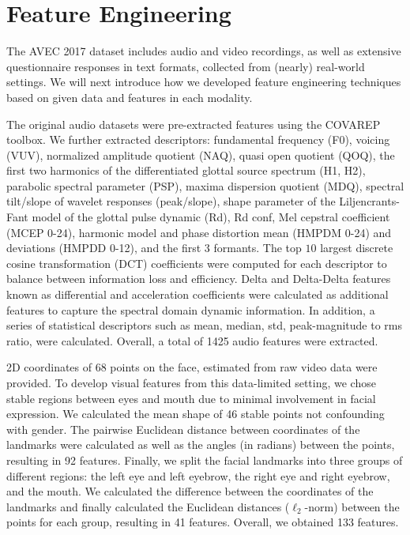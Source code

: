 \documentclass[letterpaper]{article} %
\begin{document}
\section{Feature Engineering}

The AVEC 2017 dataset includes audio and video recordings, as well as extensive questionnaire responses in text formats, collected from (nearly) real-world settings. We will next introduce how we developed feature engineering techniques based on given data and features in each modality. 

The original audio datasets were pre-extracted features using the COVAREP toolbox.  We further extracted descriptors: fundamental frequency (F0), voicing (VUV), normalized amplitude quotient (NAQ), quasi open quotient (QOQ), the first two harmonics of the differentiated glottal source spectrum (H1, H2), parabolic spectral parameter (PSP), maxima dispersion quotient (MDQ), spectral tilt/slope of wavelet responses (peak/slope), shape parameter of the Liljencrants-Fant model of the glottal pulse dynamic (Rd), Rd conf, Mel cepstral coefficient (MCEP 0-24), harmonic model and phase distortion mean (HMPDM 0-24) and deviations (HMPDD 0-12), and the first 3 formants. The top $10$ largest discrete cosine transformation (DCT) coefficients were computed for each descriptor to balance between information loss and efficiency. Delta and Delta-Delta features known as differential and acceleration coefficients were calculated as additional features to capture the spectral domain dynamic information. In addition, a series of statistical descriptors such as mean, median, std, peak-magnitude to rms ratio, were calculated. Overall, a total of 1425 audio features were extracted.

2D coordinates of 68 points on the face, estimated from raw video data were provided. To develop visual features from this data-limited setting, we chose stable regions between eyes and mouth due to minimal involvement in facial expression. We calculated the mean shape of 46 stable points not confounding with gender. The pairwise Euclidean distance between coordinates of the landmarks were calculated as well as the angles (in radians) between the points, resulting in 92 features. Finally, we split the facial landmarks into three groups of different regions: the left eye and left eyebrow, the right eye and right eyebrow, and the mouth. We calculated the difference between the coordinates of the landmarks and finally calculated the Euclidean distances ($\ell_2$-norm) between the points for each group, resulting in 41 features. Overall, we obtained 133 features.
\end{document}
